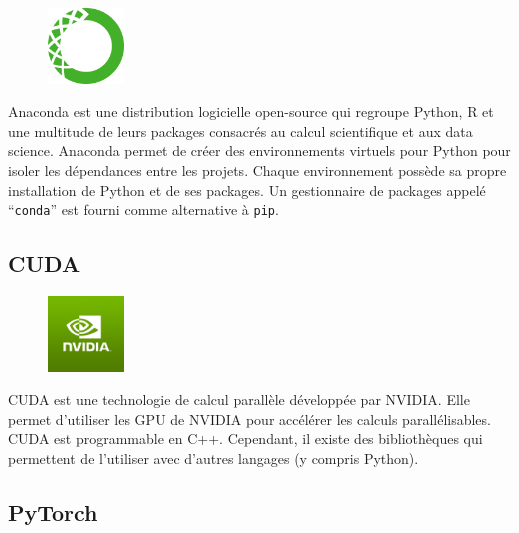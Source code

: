 \begin{figure}
    \vspace*{-\topsep}
    \begin{flushright}
        \includegraphics[width=2cm]{assets/images/anaconda.png}
    \end{flushright}
\end{figure}
Anaconda est une distribution logicielle open-source qui regroupe 
Python, R et une multitude de leurs packages consacrés au calcul scientifique et aux data science.
Anaconda permet de créer des environnements virtuels pour Python pour isoler les dépendances entre les projets.
Chaque environnement possède sa propre installation de Python et de ses packages.
Un gestionnaire de packages appelé ``\texttt{conda}'' est fourni comme alternative à \texttt{pip}.


\subsection{CUDA}%
\label{subsec.cuda}

\begin{figure}
    \vspace*{-\topsep}
    \begin{flushright}
        \includegraphics[width=2cm]{assets/images/nvidia.png}
    \end{flushright}
\end{figure}
CUDA est une technologie de calcul parallèle développée par NVIDIA.
Elle permet d'utiliser les GPU de NVIDIA pour accélérer les calculs parallélisables.
CUDA est programmable en C++.
Cependant, il existe des bibliothèques qui permettent de l'utiliser avec d'autres langages (y compris Python).


\subsection{PyTorch}%
\label{subsec.pytorch}

